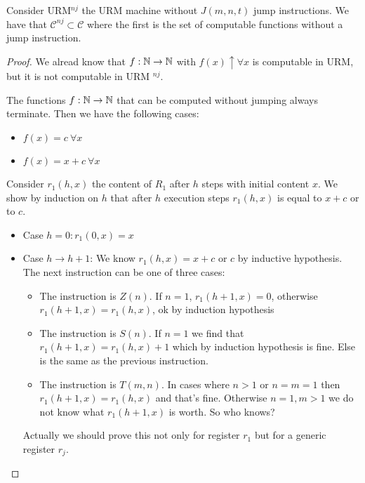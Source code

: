 \begin{exercise}
Consider URM$ ^{nj} $ the URM machine without $J(m,n,t)$ jump instructions.
We have that $ \mathcal{C}^{nj} \subset \mathcal{C} $ where the first is the set of computable functions without a jump instruction. 

\begin{proof}
We alread know that $ f: \mathbb{N} \rightarrow \mathbb{N}$ with $f(x)\uparrow \forall x $ is computable in URM, but it is not computable in URM $ ^{nj} $.

The functions $ f: \mathbb{N} \rightarrow \mathbb{N} $ that can be computed without jumping always terminate. Then we have the following cases:
\begin{itemize}
  \item $f(x) = c \ \forall x $
  \item $ f(x) = x + c \ \forall x $
\end{itemize}

Consider $ r_1(h,x) $ the content of $R_1$ after $h$ steps with initial content $x$. 
We show by induction on $h$ that after $h$ execution steps $r_1(h,x) $ is equal to $x + c$ or to $c$.

\begin{itemize}
  \item Case $h = 0: r_1(0,x) = x $

  \item Case $ h \rightarrow h+1 $: We know $ r_1(h,x) = x+c $ or $ c $ by inductive hypothesis. The next instruction can be one of three cases:
  \begin{itemize}
  \item The instruction is $Z (n)$. If $n = 1$, $r_1(h+1,x) = 0 $, otherwise $ r_1(h+1,x) = r_1(h,x) $, ok by induction hypothesis
  \item The instruction is $S (n)$. If $n = 1$ we find that $ r_1(h+1,x) = r_1(h,x)+1 $ which by induction hypothesis is fine. Else is the same as the previous instruction.
  \item The instruction is $T (m, n)$. In cases where $ n>1 $ or $ n=m=1 $ then $ r_1(h+1,x) = r_1(h,x) $ and that's fine. Otherwise $ n = 1, m > 1 $ we do not know what $ r_1(h+1,x) $ is worth. So who knows?
  \end{itemize}
  Actually we should prove this not only for register $ r_1 $ but for a generic
  register $ r_j $.
\end{itemize}
\end{proof}
\end{exercise}
